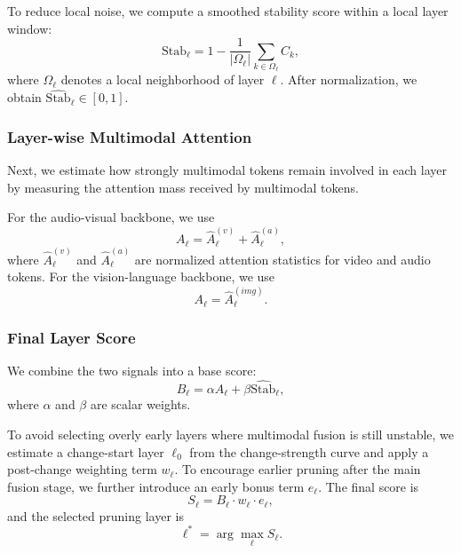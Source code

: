 \documentclass[10pt,a4paper]{article}
\begin{document}
To reduce local noise, we compute a smoothed stability score within a local layer window:
\begin{equation}
\mathrm{Stab}_\ell = 1 - \frac{1}{|\Omega_\ell|}\sum_{k \in \Omega_\ell} C_k,
\end{equation}
where $\Omega_\ell$ denotes a local neighborhood of layer $\ell$. After normalization, we obtain $\widehat{\mathrm{Stab}}_\ell \in [0,1]$.

\subsubsection{Layer-wise Multimodal Attention}
Next, we estimate how strongly multimodal tokens remain involved in each layer by measuring the attention mass received by multimodal tokens.

For the audio-visual backbone, we use
\begin{equation}
A_\ell = \widehat{A}^{(v)}_\ell + \widehat{A}^{(a)}_\ell,
\end{equation}
where $\widehat{A}^{(v)}_\ell$ and $\widehat{A}^{(a)}_\ell$ are normalized attention statistics for video and audio tokens. For the vision-language backbone, we use
\begin{equation}
A_\ell = \widehat{A}^{(img)}_\ell.
\end{equation}

\subsubsection{Final Layer Score}
We combine the two signals into a base score:
\begin{equation}
B_\ell = \alpha A_\ell + \beta \widehat{\mathrm{Stab}}_\ell,
\end{equation}
where $\alpha$ and $\beta$ are scalar weights.

To avoid selecting overly early layers where multimodal fusion is still unstable, we estimate a change-start layer $\ell_0$ from the change-strength curve and apply a post-change weighting term $w_\ell$. To encourage earlier pruning after the main fusion stage, we further introduce an early bonus term $e_\ell$. The final score is
\begin{equation}
S_\ell = B_\ell \cdot w_\ell \cdot e_\ell,
\end{equation}
and the selected pruning layer is
\begin{equation}
\ell^* = \arg\max_\ell S_\ell.
\end{equation}
\end{document}
